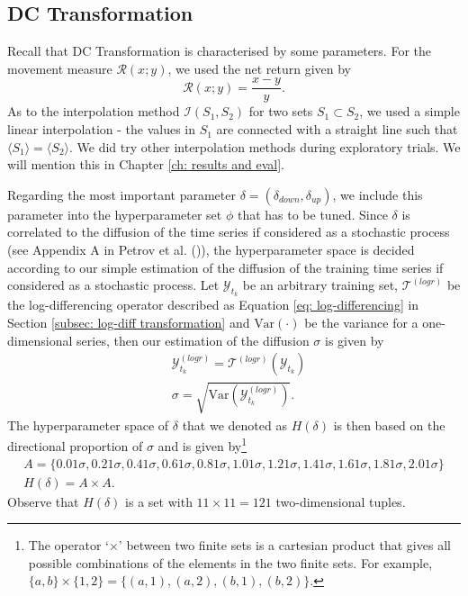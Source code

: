 \subsection{DC Transformation}
Recall that DC Transformation is characterised by some parameters. For the movement measure $\mathcal{R} (x; y)$, we used the net return given by
\begin{equation*}
    \mathcal{R} (x; y) = \frac{x - y}{y}.
\end{equation*}
As to the interpolation method $\mathcal{I} (S_1, S_2)$ for two sets $S_1 \subset S_2$, we used a simple linear interpolation - the values in $S_1$ are connected with a straight line such that $\langle S_1 \rangle = \langle S_2 \rangle$. We did try other interpolation methods during exploratory trials. We will mention this in Chapter \ref{ch: results and eval}.

Regarding the most important parameter $\delta = (\delta_{down}, \delta_{up})$, we include this parameter into the hyperparameter set $\phi$ that has to be tuned. Since $\delta$ is correlated to the diffusion of the time series if considered as a stochastic process (see Appendix A in Petrov et al. (\citeyear{petrov2018agent})), the hyperparameter space is decided according to our simple estimation of the diffusion of the training time series if considered as a stochastic process. Let $\mathcal{Y}_{t_k}$ be an arbitrary training set, $\mathcal{T}^{(logr)}$ be the log-differencing operator described as Equation \ref{eq: log-differencing} in Section \ref{subsec: log-diff transformation} and $\text{Var}(\cdot)$ be the variance for a one-dimensional series, then our estimation of the diffusion $\sigma$ is given by
\begin{align*}
    &\mathcal{Y}^{(logr)}_{t_k} = \mathcal{T}^{(logr)}(\mathcal{Y}_{t_k}) \\
    &\sigma = \sqrt{\text{Var}(\mathcal{Y}^{(logr)}_{t_k})}.
\end{align*}
The hyperparameter space of $\delta$ that we denoted as $H(\delta)$ is then based on the directional proportion of $\sigma$ and is given by\footnote{The operator `$\times$' between two finite sets is a cartesian product that gives all possible combinations of the elements in the two finite sets. For example, $\{a, b \} \times \{ 1, 2 \} = \{ (a, 1), (a, 2), (b, 1), (b, 2) \}$.}
\begin{gather*}
    A = \{ 0.01 \sigma, 0.21 \sigma, 0.41 \sigma, 0.61 \sigma, 0.81 \sigma, 1.01 \sigma, 1.21 \sigma, 1.41 \sigma, 1.61 \sigma, 1.81 \sigma, 2.01 \sigma \} \\
    H(\delta) = A \times A.
\end{gather*}
Observe that $H(\delta)$ is a set with $11 \times 11 = 121$ two-dimensional tuples.

